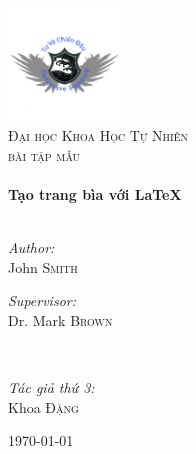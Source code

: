 \begin{titlepage} %

\begin{center} %

\includegraphics[width=3cm]{logo}\\[1cm]

\textsc{\LARGE Đại học Khoa Học Tự Nhiên}\\[1.5cm]
\textsc{\Large bài tập mẫu}\\[0.5cm]

\HRule \\[0.3cm]
{ \huge \bfseries Tạo trang bìa với \LaTeX}\\[0.4cm]
\HRule \\[1.5cm]

\begin{minipage}{4cm}%
\begin{flushleft} %
\large \emph %
{Author:}\\
John \textsc{Smith}
\end{flushleft}
\end{minipage}
\begin{minipage}{4cm}
\begin{flushright}
\large \emph
{Supervisor:} \\
Dr. Mark \textsc{Brown}
\end{flushright}
\end{minipage}

\hfill\\[0.3cm]

\begin{minipage}{4cm}%
\begin{flushleft} %
\large \emph %
{Tác giả thứ 3:}\\
Khoa \textsc{Đặng}
\end{flushleft}
\end{minipage}
\begin{minipage}{4cm}
\begin{flushright}

\end{flushright}
\end{minipage}
\vfill %

{\large \today}

\end{center}
\end {titlepage}